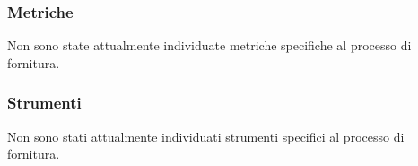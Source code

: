     \subsubsection{Metriche}
    Non sono state attualmente individuate metriche specifiche al processo di fornitura.
    \subsubsection{Strumenti}
    Non sono stati attualmente individuati strumenti specifici al processo di fornitura.
